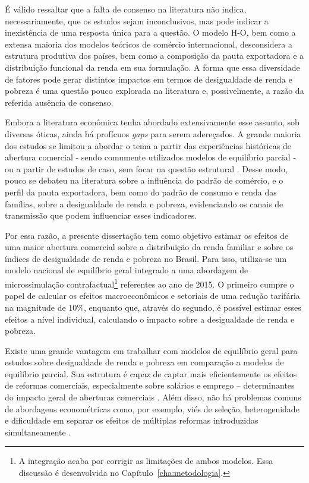 É válido ressaltar que a falta de consenso na literatura não indica, necessariamente, que os estudos sejam inconclusivos, mas pode indicar a inexistência de uma resposta única para a questão. O modelo H-O, bem como a extensa maioria dos modelos teóricos de comércio internacional, desconsidera a estrutura produtiva dos países, bem como a composição da pauta exportadora e a distribuição funcional da renda em sua formulação. A forma que essa diversidade de fatores pode gerar distintos impactos em termos de desigualdade de renda e pobreza é uma questão pouco explorada na literatura e, possivelmente, a razão da referida ausência de consenso.

Embora a literatura econômica tenha abordado extensivamente esse assunto, sob diversas óticas, ainda há profícuos \textit{gaps} para serem adereçados. A grande maioria dos estudos se limitou a abordar o tema a partir das experiências históricas de abertura comercial - sendo comumente utilizados modelos de equilíbrio parcial \cite{castilho12, bayar17} - ou a partir de estudos de caso, sem focar na questão estrutural \cite{borrazetal12, estrades12, campostimini22}. Desse modo, pouco se debateu na literatura sobre a influência do padrão de comércio, e o perfil da pauta exportadora, bem como do padrão de consumo e renda das famílias, sobre a desigualdade de renda e pobreza, evidenciando os canais de transmissão que podem influenciar esses indicadores. 

Por essa razão, a presente dissertação tem como objetivo estimar os efeitos de uma maior abertura comercial sobre a distribuição da renda familiar e sobre os índices de desigualdade de renda e pobreza no Brasil. Para isso, utiliza-se um modelo nacional de equilíbrio geral integrado a uma abordagem de microssimulação contrafactual\footnote{A integração acaba por corrigir as limitações de ambos modelos. Essa discussão é desenvolvida no Capítulo~\ref{cha:metodologia}.} referentes ao ano de 2015. O primeiro cumpre o papel de calcular os efeitos macroeconômicos e setoriais de uma redução tarifária na magnitude de 10\%, enquanto que, através do segundo, é possível estimar esses efeitos a nível individual, calculando o impacto sobre a desigualdade de renda e pobreza.

Existe uma grande vantagem em trabalhar com modelos de equilíbrio geral para estudos sobre desigualdade de renda e pobreza em comparação a modelos de equilíbrio parcial. Sua estrutura é capaz de captar mais eficientemente os efeitos de reformas comerciais, especialmente sobre salários e emprego -- determinantes do impacto geral de aberturas comerciais \cite{naranpanawa11}. Além disso, não há problemas comuns de abordagens econométricas como, por exemplo, viés de seleção, heterogenidade e dificuldade em separar os efeitos de múltiplas reformas introduzidas simultaneamente \cite{anderson20}.

